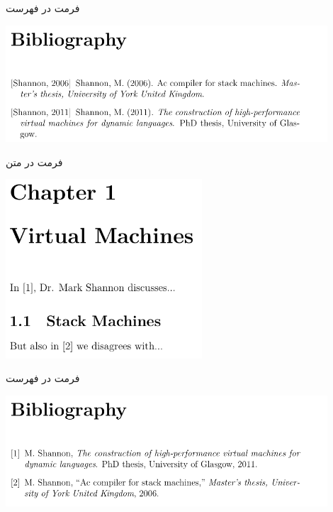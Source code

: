 \begin{frame}{فرمت  در فهرست}
\begin{center}
\includegraphics[width=0.9\textwidth, height=0.5\textheight]{docs/images/apalike-2}
\end{center}
\end{frame}

\begin{frame}{فرمت  در متن}
\begin{center}
\includegraphics[width=0.55\textwidth, height=0.7\textheight]{docs/images/ieeetr-1}
\end{center}
\end{frame}

\begin{frame}{فرمت  در فهرست}
\begin{center}
\includegraphics[width=0.9\textwidth, height=0.5\textheight]{docs/images/ieeetr-2}
\end{center}
\end{frame}
